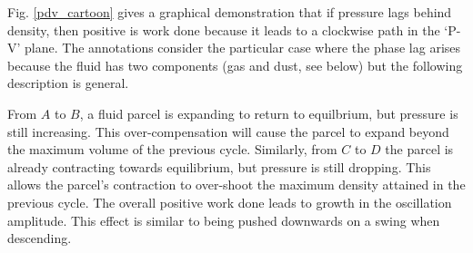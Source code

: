 \documentclass[iop, numberedappendix]{emulateapj}
\begin{document}

Fig. \ref{pdv_cartoon} gives a graphical demonstration that 
if pressure lags behind density, then positive is work done 
because it leads to a clockwise path in the 
`P-V' plane. The annotations consider the particular case where the
phase lag arises because the fluid has two components (gas and dust,
see below) but the following description is general. 

From $A$ to $B$, a fluid parcel is expanding to return to 
equilbrium, but pressure is still 
increasing. This over-compensation will cause the parcel to expand
beyond the maximum volume of the previous cycle. 
Similarly, from $C$ to $D$ the parcel is already contracting towards
equilibrium, but pressure 
is still dropping. This allows the  
parcel's contraction to over-shoot the maximum density attained in the
previous cycle. 
The overall positive work done leads to growth in the oscillation amplitude. 
This effect is similar to being pushed downwards on a swing when 
descending.
\end{document}
